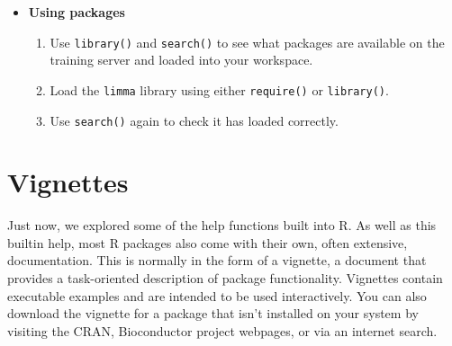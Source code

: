\documentclass[a4paper]{book}
\newenvironment{rmdblock}[1]
  {\vspace{1.5em}\begin{shaded*}
  \begin{itemize}
  \renewcommand{\labelitemi}{
    \raisebox{-.7\height}[0pt][0pt]{
      {\setkeys{Gin}{width=3em,keepaspectratio}\texttt{[image: images/\#1]}}
    }
  }
  \item
  }
  {
  \end{itemize}
  \end{shaded*}
  }
\newenvironment{rmdexercise}
  {\begin{rmdblock}{exercise}}
  {\end{rmdblock}}
\begin{document}
\begin{rmdexercise}
\textbf{Using packages}

\begin{enumerate}
\def\labelenumi{\arabic{enumi}.}
\item
  Use \texttt{library()} and \texttt{search()} to see what packages are
  available on the training server and loaded into your workspace.
\item
  Load the \texttt{limma} library using either \texttt{require()} or
  \texttt{library()}.
\item
  Use \texttt{search()} again to check it has loaded correctly.
\end{enumerate}
\end{rmdexercise}

\section{Vignettes}\label{vignettes}

Just now, we explored some of the help functions built into R. As well
as this builtin help, most R packages also come with their own, often
extensive, documentation. This is normally in the form of a vignette, a
document that provides a task-oriented description of package
functionality. Vignettes contain executable examples and are intended to
be used interactively. You can also download the vignette for a package
that isn't installed on your system by visiting the CRAN, Bioconductor
project webpages, or via an internet search.
\end{document}
